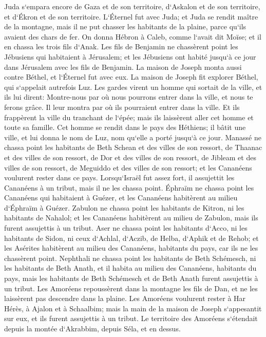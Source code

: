 \verse Juda s`empara encore de Gaza et de son territoire, d`Askalon et de son territoire, et d`Ékron et de son territoire. 
\verse L`Éternel fut avec Juda; et Juda se rendit maître de la montagne, mais il ne put chasser les habitants de la plaine, parce qu`ils avaient des chars de fer. 
\verse On donna Hébron à Caleb, comme l`avait dit Moïse; et il en chassa les trois fils d`Anak. 
\verse Les fils de Benjamin ne chassèrent point les Jébusiens qui habitaient à Jérusalem; et les Jébusiens ont habité jusqu`à ce jour dans Jérusalem avec les fils de Benjamin. 
\verse La maison de Joseph monta aussi contre Béthel, et l`Éternel fut avec eux. 
\verse La maison de Joseph fit explorer Béthel, qui s`appelait autrefois Luz. 
\verse Les gardes virent un homme qui sortait de la ville, et ils lui dirent: Montre-nous par où nous pourrons entrer dans la ville, et nous te ferons grâce. 
\verse Il leur montra par où ils pourraient entrer dans la ville. Et ils frappèrent la ville du tranchant de l`épée; mais ils laissèrent aller cet homme et toute sa famille. 
\verse Cet homme se rendit dans le pays des Héthiens; il bâtit une ville, et lui donna le nom de Luz, nom qu`elle a porté jusqu`à ce jour. 
\verse Manassé ne chassa point les habitants de Beth Schean et des villes de son ressort, de Thaanac et des villes de son ressort, de Dor et des villes de son ressort, de Jibleam et des villes de son ressort, de Meguiddo et des villes de son ressort; et les Cananéens voulurent rester dans ce pays. 
\verse Lorsqu`Israël fut assez fort, il assujettit les Cananéens à un tribut, mais il ne les chassa point. 
\verse Éphraïm ne chassa point les Cananéens qui habitaient à Guézer, et les Cananéens habitèrent au milieu d`Éphraïm à Guézer. 
\verse Zabulon ne chassa point les habitants de Kitron, ni les habitants de Nahalol; et les Cananéens habitèrent au milieu de Zabulon, mais ils furent assujettis à un tribut. 
\verse Aser ne chassa point les habitants d`Acco, ni les habitants de Sidon, ni ceux d`Achlal, d`Aczib, de Helba, d`Aphik et de Rehob; 
\verse et les Asérites habitèrent au milieu des Cananéens, habitants du pays, car ils ne les chassèrent point. 
\verse Nephthali ne chassa point les habitants de Beth Schémesch, ni les habitants de Beth Anath, et il habita au milieu des Cananéens, habitants du pays, mais les habitants de Beth Schémesch et de Beth Anath furent assujettis à un tribut. 
\verse Les Amoréens repoussèrent dans la montagne les fils de Dan, et ne les laissèrent pas descendre dans la plaine. 
\verse Les Amoréens voulurent rester à Har Hérès, à Ajalon et à Schaalbim; mais la main de la maison de Joseph s`appesantit sur eux, et ils furent assujettis à un tribut. 
\verse Le territoire des Amoréens s`étendait depuis la montée d`Akrabbim, depuis Séla, et en dessus. 

